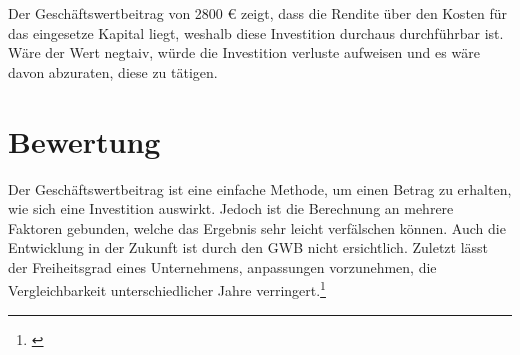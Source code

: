 Der Geschäftswertbeitrag von 2800 € zeigt, dass die Rendite über den Kosten für das eingesetze Kapital liegt, weshalb diese Investition durchaus durchführbar ist. Wäre der Wert negtaiv, würde die Investition verluste aufweisen und es wäre davon abzuraten, diese zu tätigen.

\section{Bewertung}

Der Geschäftswertbeitrag ist eine einfache Methode, um einen Betrag zu erhalten, wie sich eine Investition auswirkt. Jedoch ist die Berechnung an mehrere Faktoren gebunden, welche das Ergebnis sehr leicht verfälschen können. Auch die Entwicklung in der Zukunft ist durch den GWB nicht ersichtlich. Zuletzt lässt der Freiheitsgrad eines Unternehmens, anpassungen vorzunehmen, die Vergleichbarkeit unterschiedlicher Jahre verringert.\footnote{\cite{controlling-eva}}
